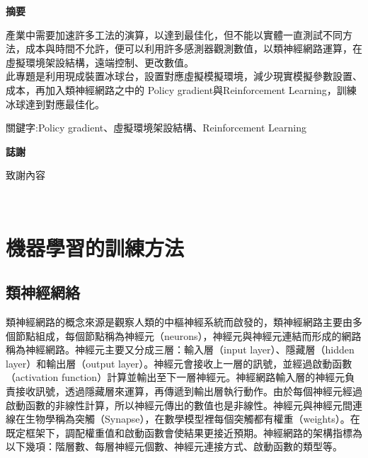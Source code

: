 \documentclass[14pt,a4paper]{report}  %
\begin{document}
\newpage
\clearpage
{} %
\begin{center}
\LARGE\textbf{摘要}\\
\begin{flushleft}
\fontsize{14pt}{2.5pt}\hspace{12pt} 產業中需要加速許多工法的演算，以達到最佳化，但不能以實體一直測試不同方法，成本與時間不允許，便可以利用許多感測器觀測數值，以類神經網路運算，在虛擬環境架設結構，遠端控制、更改數值。\\
\vspace{1em}
\sectionef\hspace{12pt} 此專題是利用現成裝置冰球台，設置對應虛擬模擬環境，減少現實模擬參數設置、成本，再加入類神經網路之中的 Policy gradient與Reinforcement Learning，訓練冰球達到對應最佳化。
\end{flushleft}
\begin{center}
\fontsize{14pt}{2.5pt}關鍵字:\sectionef Policy gradient、虛擬環境架設結構、Reinforcement Learning
\end{center}
\newpage
\centerline\LARGE\textbf{誌謝}\\
\begin{flushleft}
\fontsize{14pt}{2.5pt}\hspace{12pt}致謝內容
\end{flushleft}
\newpage
\renewcommand{\contentsname}{\centerline{\fontsize{18pt}{\baselineskip}\selectfont\textbf{目\quad 錄}}}
\tableofcontents　　%
\newpage
\renewcommand{\listfigurename}{\centerline{\fontsize{18pt}{\baselineskip}\selectfont\textbf{圖\quad 表\quad 目\quad 錄 }}}
\listoffigures
\newpage
\end{center}

\chapter{機器學習的訓練方法}
\setcounter{page}{1}  %
\fontsize{14pt}{2.5pt}\sectionef
\section{類神經網絡}
\qquad 類神經網路的概念來源是觀察人類的中樞神經系統而啟發的，類神經網路主要由多個節點組成，每個節點稱為神經元（neurons），神經元與神經元連結而形成的網路稱為神經網路。神經元主要又分成三層：輸入層（input layer）、隱藏層（hidden layer）和輸出層（output layer）。神經元會接收上一層的訊號，並經過啟動函數（activation function）計算並輸出至下一層神經元。神經網路輸入層的神經元負責接收訊號，透過隱藏層來運算，再傳遞到輸出層執行動作。由於每個神經元經過啟動函數的非線性計算，所以神經元傳出的數值也是非線性。神經元與神經元間連線在生物學稱為突觸（Synapse），在數學模型裡每個突觸都有權重（weights）。在既定框架下，調配權重值和啟動函數會使結果更接近預期。神經網路的架構指標為以下幾項：階層數、每層神經元個數、神經元連接方式、啟動函數的類型等。
\end{document}
